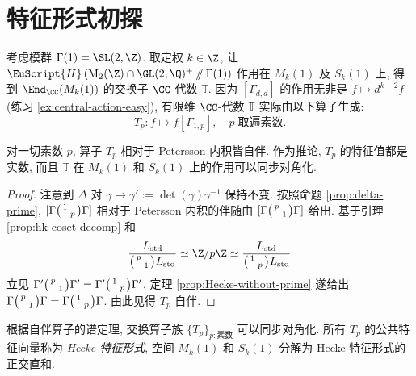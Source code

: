 \section{特征形式初探}\label{sec:eigenform-full-level}
考虑模群 $\Gamma(1) = \SL(2, \Z)$. 取定权 $k \in \Z$, 让 $\EuScript{H}\left(\Mat_2(\Z) \cap \GL(2, \Q)^+ \sslash \Gamma(1) \right)$ 作用在 $M_k(1)$ 及 $S_k(1)$ 上, 得到 $\End_{\CC}(M_k(1))$ 的交换子 $\CC$-代数 $\mathbb{T}$. 因为 $[\Gamma_{d,d}]$ 的作用无非是 $f \mapsto d^{k-2} f$ (练习 \ref{ex:central-action-easy}), 有限维 $\CC$-代数 $\mathbb{T}$ 实际由以下算子生成:
\[ T_p: f \mapsto f\left[ \Gamma_{1,p} \right], \quad p\; \text{取遍素数}. \]

\begin{lemma}
	对一切素数 $p$, 算子 $T_p$ 相对于 Petersson 内积皆自伴. 作为推论, $T_p$ 的特征值都是实数, 而且 $\mathbb{T}$ 在 $M_k(1)$ 和 $S_k(1)$ 上的作用可以同步对角化.
\end{lemma}
\begin{proof}
	注意到 $\Delta$ 对 $\gamma \mapsto \gamma' := \det(\gamma) \gamma^{-1}$ 保持不变. 按照命题 \ref{prop:delta-prime}, $[\Gamma\bigl(\begin{smallmatrix} 1 &  \\  & p \end{smallmatrix}\bigr)\Gamma]$ 相对于 Petersson 内积的伴随由 $[\Gamma\bigl(\begin{smallmatrix} p &  \\  & 1 \end{smallmatrix}\bigr)\Gamma]$ 给出. 基于引理 \ref{prop:hk-coset-decomp} 和
	\[ \frac{L_\text{std}}{\twomatrix{p}{}{}{1} L_\text{std}} \simeq \Z/p\Z \simeq \frac{L_\text{std}}{\twomatrix{1}{}{}{p} L_\text{std}} \]
	立见 $\Gamma' \bigl(\begin{smallmatrix} p &  \\  & 1 \end{smallmatrix}\bigr) \Gamma' = \Gamma' \bigl(\begin{smallmatrix} 1 &  \\  & p \end{smallmatrix}\bigr) \Gamma'$. 定理 \ref{prop:Hecke-without-prime} 遂给出 $\Gamma \bigl(\begin{smallmatrix} p &  \\  & 1 \end{smallmatrix}\bigr) \Gamma = \Gamma \bigl(\begin{smallmatrix} 1 &  \\  & p \end{smallmatrix}\bigr) \Gamma$. 由此见得 $T_p$ 自伴.
\end{proof}

根据自伴算子的谱定理, 交换算子族 $\{ T_p \}_{p: \text{素数}}$ 可以同步对角化. 所有 $T_p$ 的公共特征向量称为 \emph{Hecke 特征形式}, 空间 $M_k(1)$ 和 $S_k(1)$ 分解为 Hecke 特征形式的正交直和.

